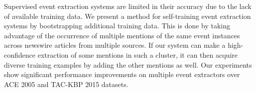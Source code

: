 Supervised event extraction systems are limited in their accuracy due to the lack of available training data. We present a method for self-training event extraction systems by bootstrapping additional training data. This is done by taking advantage of the occurrence of multiple mentions of the same event instances across newswire articles from multiple sources. If our system can make a high-confidence extraction of some mentions in such a cluster, it can then acquire diverse training examples by adding the other mentions as well. Our experiments show significant performance improvements on multiple event extractors over ACE 2005 and TAC-KBP 2015 datasets.
